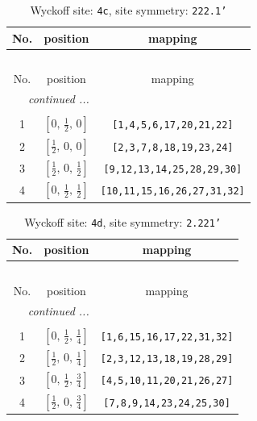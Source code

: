 \documentclass[fleqn,8pt]{jsarticle}
\begin{document}
\renewcommand{\arraystretch}{1.2}
\begin{longtable}{ccc}
\caption{Wyckoff site: {\tt 4c}, site symmetry: {\tt 222.1'}}
 \\
 \hline \hline
No. & position & mapping \\ \hline \endfirsthead

\multicolumn{2}{l}{\tablename\ \thetable{}} \\
 \hline \hline
No. & position & mapping \\ \hline \endhead

 \hline \hline
\multicolumn{2}{r}{\footnotesize\it continued ...} \\ \endfoot

 \hline \hline
\multicolumn{2}{r}{} \\ \endlastfoot

1 & $\left[ 0,\, \frac{1}{2},\, 0 \right]$ & {\tt [1,4,5,6,17,20,21,22]} \\ \hline
2 & $\left[ \frac{1}{2},\, 0,\, 0 \right]$ & {\tt [2,3,7,8,18,19,23,24]} \\ \hline
3 & $\left[ \frac{1}{2},\, 0,\, \frac{1}{2} \right]$ & {\tt [9,12,13,14,25,28,29,30]} \\ \hline
4 & $\left[ 0,\, \frac{1}{2},\, \frac{1}{2} \right]$ & {\tt [10,11,15,16,26,27,31,32]} \\
\end{longtable}
\renewcommand{\arraystretch}{1.2}
\begin{longtable}{ccc}
\caption{Wyckoff site: {\tt 4d}, site symmetry: {\tt 2.221'}}
 \\
 \hline \hline
No. & position & mapping \\ \hline \endfirsthead

\multicolumn{2}{l}{\tablename\ \thetable{}} \\
 \hline \hline
No. & position & mapping \\ \hline \endhead

 \hline \hline
\multicolumn{2}{r}{\footnotesize\it continued ...} \\ \endfoot

 \hline \hline
\multicolumn{2}{r}{} \\ \endlastfoot

1 & $\left[ 0,\, \frac{1}{2},\, \frac{1}{4} \right]$ & {\tt [1,6,15,16,17,22,31,32]} \\ \hline
2 & $\left[ \frac{1}{2},\, 0,\, \frac{1}{4} \right]$ & {\tt [2,3,12,13,18,19,28,29]} \\ \hline
3 & $\left[ 0,\, \frac{1}{2},\, \frac{3}{4} \right]$ & {\tt [4,5,10,11,20,21,26,27]} \\ \hline
4 & $\left[ \frac{1}{2},\, 0,\, \frac{3}{4} \right]$ & {\tt [7,8,9,14,23,24,25,30]} \\
\end{longtable}
\end{document}
